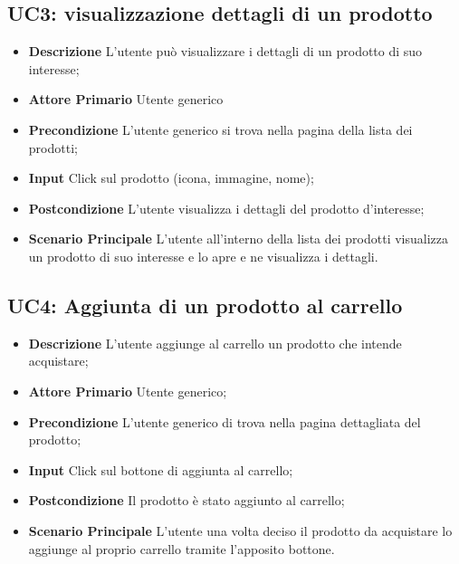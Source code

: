         \subsection{UC3: visualizzazione dettagli di un prodotto}
        \label{sec:UC3}
        \begin{itemize}
            \item \textbf{Descrizione} L'utente può visualizzare i dettagli di un prodotto di suo interesse;
            \item \textbf{Attore Primario} Utente generico
            \item \textbf{Precondizione} L'utente generico si trova nella pagina della lista dei prodotti;
            \item \textbf{Input} Click sul prodotto (icona, immagine, nome);
            \item \textbf{Postcondizione} L'utente visualizza i dettagli del prodotto d'interesse;
            \item \textbf{Scenario Principale} L'utente all'interno della lista dei prodotti visualizza un prodotto di suo interesse e lo apre e ne visualizza i dettagli.
        \end{itemize}
        \subsection{UC4: Aggiunta di un prodotto al carrello}
        \label{sec:UC4}
        \begin{itemize}
            \item \textbf{Descrizione} L'utente aggiunge al carrello un prodotto che intende acquistare;
            \item \textbf{Attore Primario} Utente generico;
            \item \textbf{Precondizione} L'utente generico di trova nella pagina dettagliata del prodotto;
            \item \textbf{Input} Click sul bottone di aggiunta al carrello;
            \item \textbf{Postcondizione} Il prodotto è stato aggiunto al carrello;
            \item \textbf{Scenario Principale} L'utente una volta deciso il prodotto da acquistare lo aggiunge al proprio carrello tramite l'apposito bottone.
        \end{itemize}
